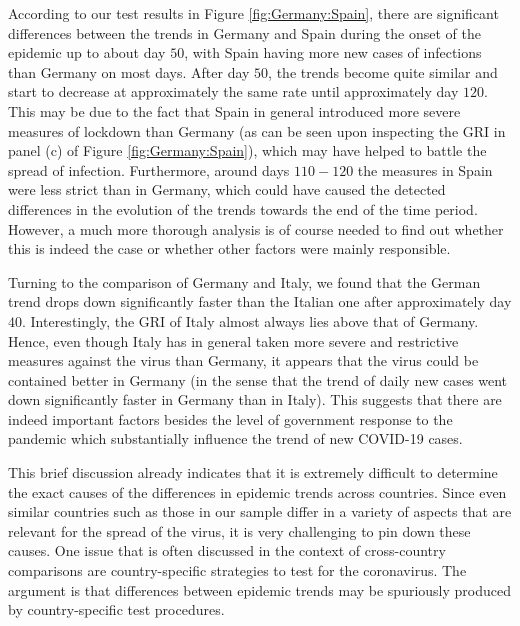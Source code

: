 \documentclass[a4paper,12pt]{article}
\numberwithin{equation}{section}
\begin{document}
According to our test results in Figure \ref{fig:Germany:Spain}, there are significant differences between the trends in Germany and Spain during the onset of the epidemic up to about day $50$, with Spain having more new cases of infections than Germany on most days. After day $50$, the trends become quite similar and start to decrease at approximately the same rate {\color{red}until approximately day $120$}. This may be due to the fact that Spain in general introduced more severe measures of lockdown than Germany (as can be seen upon inspecting the GRI in panel (c) of Figure \ref{fig:Germany:Spain}), which may have helped to battle the spread of infection. {\color{red} Furthermore, around days $110-120$ the measures in Spain were less strict than in Germany, which could have caused the detected differences in the evolution of the trends towards the end of the time period.} However, a much more thorough analysis is of course needed to find out whether this is indeed the case or whether other factors were mainly responsible. 

Turning to the comparison of Germany and Italy, we found that the German trend drops down significantly faster than the Italian one after approximately day $40$. Interestingly, the GRI of Italy almost always lies above that of Germany. Hence, even though Italy has in general taken more severe and restrictive measures against the virus than Germany, it appears that the virus could be contained better in Germany (in the sense that the trend of daily new cases went down significantly faster in Germany than in Italy). This suggests that there are indeed important factors besides the level of government response to the pandemic which substantially influence the trend of new COVID-19 cases. 


This brief discussion already indicates that it is extremely difficult to determine the exact causes of the differences in epidemic trends across countries. Since even similar countries such as those in our sample differ in a variety of aspects that are relevant for the spread of the virus, it is very challenging to pin down these causes. One issue that is often discussed in the context of cross-country comparisons are country-specific strategies to test for the coronavirus. The argument is that differences between epidemic trends may be spuriously produced by country-specific test procedures.
\end{document}
